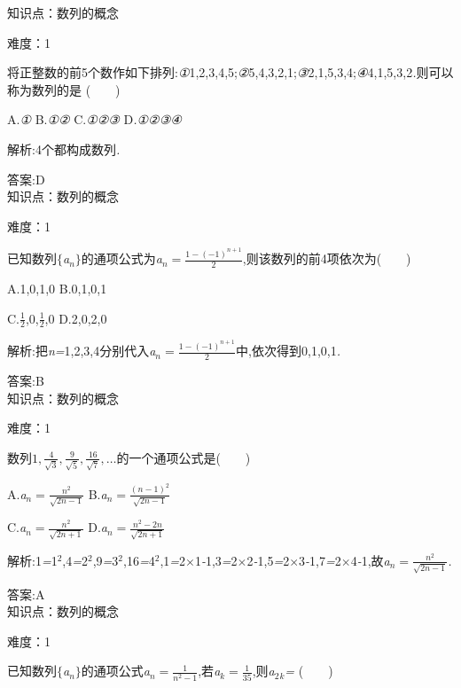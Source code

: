 \documentclass{article} %
\begin{document}
知识点：数列的概念

难度：1

将正整数的前5个数作如下排列:\textit{①}1,2,3,4,5;\textit{②}5,4,3,2,1;\textit{③}2,1,5,3,4;\textit{④}4,1,5,3,2\textit{.}则可以称为数列的是 (\textit{　　})

 A.\textit{①} B.\textit{①②} C.\textit{①②③} D\textit{.①②③④}

 解析:4个都构成数列\textit{.}

 答案:D \\

知识点：数列的概念

难度：1

已知数列$\mathrm{\{}$\textit{a${}_{n}$}$\mathrm{\}}$的通项公式为\textit{a${}_{n}=\frac{1-(-1)^{n+1}}{2}$},则该数列的前4项依次为(\textit{　　})

 A.1,0,1,0 B.0,1,0,1

 C.$\frac{1}{2}$,0,$\frac{1}{2}$,0 D.2,0,2,0

 解析:把\textit{n=}1,2,3,4分别代入\textit{a${}_{n}=\frac{1-(-1)^{n+1}}{2}$}中,依次得到0,1,0,1\textit{.}

 答案:B \\

知识点：数列的概念

难度：1
 
\textit{}数列$1,\frac{4}{\sqrt{3}},\frac{9}{\sqrt{5}},\frac{16}{\sqrt{7}},\dots$的一个通项公式是(\textit{　　})

 A.\textit{a${}_{n}=\frac{n^2}{\sqrt{2n-1}}$} B.\textit{a${}_{n}=\frac{(n-1)^2}{\sqrt{2n-1}}$}

 C.\textit{a${}_{n}=\frac{n^2}{\sqrt{2n+1}}$} D.\textit{a${}_{n}=\frac{n^2-2n}{\sqrt{2n+1}}$}

 解析:1\textit{=}1${}^{2}$,4\textit{=}2${}^{2}$,9\textit{=}3${}^{2}$,16\textit{=}4${}^{2}$,1\textit{=}2\textit{$\times$}1\textit{-}1,3\textit{=}2\textit{$\times$}2\textit{-}1,5\textit{=}2\textit{$\times$}3\textit{-}1,7\textit{=}2\textit{$\times$}4\textit{-}1,故\textit{a${}_{n}=\frac{n^2}{\sqrt{2n-1}}$}\textit{.}

 答案:A \\

知识点：数列的概念

难度：1

\textit{}已知数列$\mathrm{\{}$\textit{a${}_{n}$}$\mathrm{\}}$的通项公式\textit{a${}_{n}=\frac{1}{n^2-1}$},若\textit{a${}_{k}=\frac{1}{35}$},则\textit{a}${}_{2}$\textit{${}_{k}$=} (\textit{　　})
\end{document}
